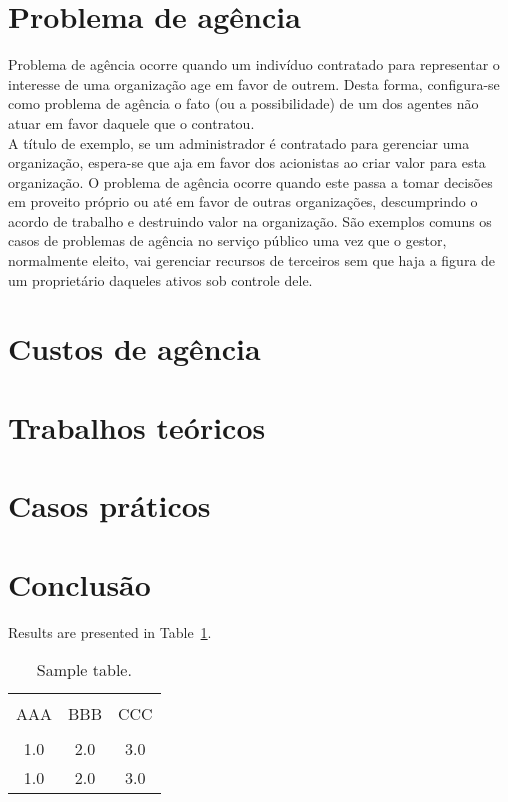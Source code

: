 \documentclass[jou,apacite]{apa6}
\begin{document}
\section{Problema de agência}
Problema de agência ocorre quando um indivíduo contratado para representar o interesse de uma organização age em favor de outrem. Desta forma, configura-se como problema de agência o fato (ou a possibilidade) de um dos agentes não atuar em favor daquele que o contratou.  \\
A título de exemplo, se um administrador é contratado para gerenciar uma organização, espera-se que aja em favor dos acionistas ao criar valor para esta organização. O problema de agência ocorre quando este passa a tomar decisões em proveito próprio ou até em favor de outras organizações, descumprindo o acordo de trabalho e destruindo valor na organização. São exemplos comuns os casos de problemas de agência no serviço público uma vez que o gestor, normalmente eleito, vai gerenciar recursos de terceiros sem que haja a figura de um proprietário daqueles ativos sob controle dele. 

\section{Custos de agência}

\section{Trabalhos teóricos}


\section{Casos práticos}


\section{Conclusão}





Results are presented in Table~\ref{tab1}.
\begin{table}[!htb]
\caption{Sample table.}\label{tab1}
\begin{tabular}{ccc}
\hline\\[-1.5ex]
AAA & BBB & CCC \\[0.5ex]
\hline\\[-1.5ex]
1.0 & 2.0 & 3.0\\[0.5ex]
1.0 & 2.0 & 3.0\\[0.5ex]
\hline
\end{tabular}
\end{table}



\end{document}

